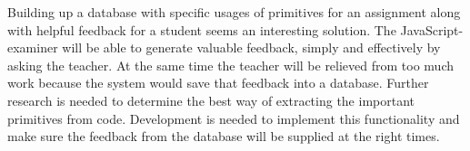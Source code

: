 \documentclass{article}
\begin{document}
Building up a database with specific usages of primitives for an assignment
along with helpful feedback for a student seems an interesting solution. The
JavaScript-examiner will be able to generate valuable feedback, simply and
effectively by asking the teacher. At the same time the teacher will be
relieved from too much work because the system would save that feedback into a
database. Further research is needed to determine the best way of extracting
the important primitives from code. Development is needed to implement this
functionality and make sure the feedback from the database will be supplied at
the right times.



\end{document}
